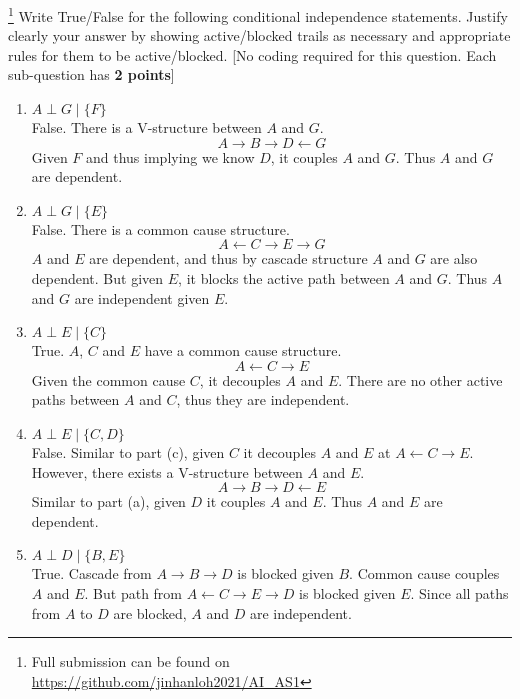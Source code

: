 \item\footnote{Full submission can be found on \url{https://github.com/jinhanloh2021/AI\_AS1}} Write True/False for the following conditional independence statements. Justify clearly your answer by showing active/blocked trails as necessary and appropriate rules for them to be active/blocked. [No coding required for this question. Each sub-question has \textbf{2 points}]

\begin{enumerate}
      \item $A \perp G \mid \{F\}$\\
            False. There is a V-structure between $A$ and $G$.
            $$A \rightarrow B \rightarrow D \leftarrow G$$
            Given $F$ and thus implying we know $D$, it couples $A$ and $G$. Thus $A$ and $G$ are dependent.
      \item $A \perp G \mid \{E\}$\\
            False. There is a common cause structure.
            $$A \leftarrow C \rightarrow E \rightarrow G$$
            $A$ and $E$ are dependent, and thus by cascade structure $A$ and $G$ are also dependent. But given $E$, it blocks the active path between $A$ and $G$. Thus $A$ and $G$ are independent given $E$.
      \item $A \perp E \mid \{C\}$\\
            True. $A$, $C$ and $E$ have a common cause structure.
            $$A \leftarrow C \rightarrow E$$
            Given the common cause $C$, it decouples $A$ and $E$. There are no other active paths between $A$ and $C$, thus they are independent.
      \item $A \perp E \mid \{C, D\}$\\
            False. Similar to part (c), given $C$ it decouples $A$ and $E$ at $A \leftarrow C \rightarrow E$. However, there exists a V-structure between $A$ and $E$.
            $$A \rightarrow B \rightarrow D \leftarrow E$$
            Similar to part (a), given $D$ it couples $A$ and $E$. Thus $A$ and $E$ are dependent.
      \item $A \perp D \mid \{B, E\}$\\
            True. Cascade from $A \rightarrow B \rightarrow D$ is blocked given $B$. Common cause couples $A$ and $E$. But path from $A \leftarrow C \rightarrow E \rightarrow D$ is blocked given $E$. Since all paths from $A$ to $D$ are blocked, $A$ and $D$ are independent.
\end{enumerate}
\clearpage